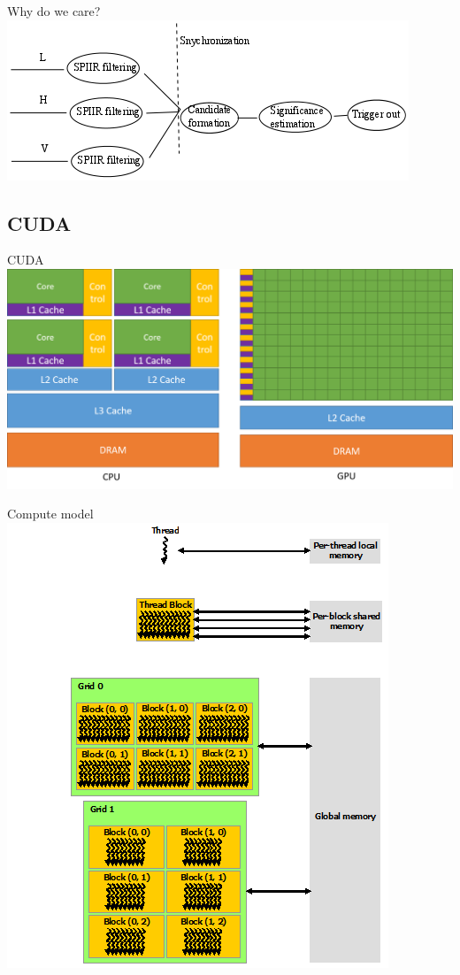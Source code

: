 \documentclass{beamer}
\begin{document}
\begin{frame}{Why do we care?}
    \centering
    \includegraphics[width=\textwidth]{../resources/current_pipeline.png}
\end{frame}

\subsection{CUDA}

\begin{frame}{CUDA}
    \centering
    \includegraphics[width=\textwidth]{gpu-cpu.png}
\end{frame}

\begin{frame}{Compute model}
    \centering
    \includegraphics[height=0.7\textheight]{memory-hierarchy.png}
\end{frame}
\end{document}
